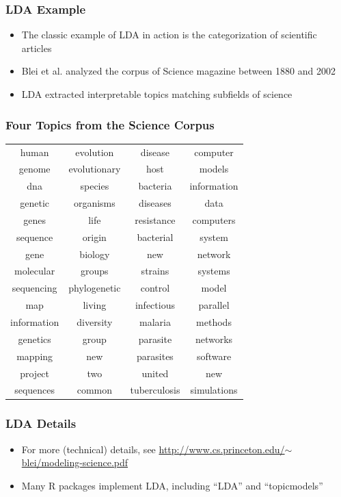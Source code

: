 \documentclass[xcolor=dvipsnames, 9pt]{beamer}
\begin{document}
\begin{frame}[fragile]
  \frametitle{LDA Example}
  \begin{itemize}
    \item{The classic example of LDA in action is the categorization of scientific articles}
    \item{Blei et al. analyzed the corpus of Science magazine between 1880 and 2002}
    \item{LDA extracted interpretable topics matching subfields of science}
  \end{itemize}
\end{frame}

\begin{frame}[fragile]
  \frametitle{Four Topics from the Science Corpus}
  
  \begin{center}
    \begin{tabular}{cccc}
      human & evolution & disease & computer \\
      genome & evolutionary & host & models \\
      dna & species & bacteria & information \\
      genetic & organisms & diseases & data \\
      genes & life & resistance & computers \\
      sequence & origin & bacterial & system \\
      gene & biology & new & network \\
      molecular & groups & strains & systems \\
      sequencing & phylogenetic & control & model \\
      map & living & infectious & parallel \\
      information & diversity & malaria & methods \\
      genetics & group & parasite & networks \\
      mapping & new & parasites & software \\
      project & two & united & new \\
      sequences & common & tuberculosis & simulations \\
    \end{tabular}
  \end{center}
\end{frame}

\begin{frame}[fragile]
  \frametitle{LDA Details}
  
  \begin{itemize}
    \item{For more (technical) details, see 
\href{http://www.cs.princeton.edu/$\sim$blei/modeling-science.pdf}{http://www.cs.princeton.edu/$\sim$blei/modeling-science.pdf}}
    \item{Many R packages implement LDA, including ``LDA'' and ``topicmodels''}
  \end{itemize}
\end{frame}
\end{document}
